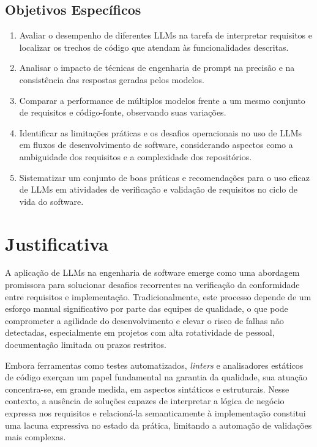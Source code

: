\subsection{Objetivos Específicos}
\begin{enumerate}
    \item Avaliar o desempenho de diferentes LLMs na tarefa de interpretar requisitos e localizar os trechos de código que atendam às funcionalidades descritas.
    
    \item Analisar o impacto de técnicas de engenharia de prompt na precisão e na consistência das respostas geradas pelos modelos.
    
    \item Comparar a performance de múltiplos modelos frente a um mesmo conjunto de requisitos e código-fonte, observando suas variações.
    
    \item Identificar as limitações práticas e os desafios operacionais no uso de LLMs em fluxos de desenvolvimento de software, considerando aspectos como a ambiguidade dos requisitos e a complexidade dos repositórios.
    
    \item Sistematizar um conjunto de boas práticas e recomendações para o uso eficaz de LLMs em atividades de verificação e validação de requisitos no ciclo de vida do software.
\end{enumerate}

\section{Justificativa}

A aplicação de LLMs na engenharia de software emerge como uma abordagem promissora para solucionar desafios recorrentes na verificação da conformidade entre requisitos e implementação. Tradicionalmente, este processo depende de um esforço manual significativo por parte das equipes de qualidade, o que pode comprometer a agilidade do desenvolvimento e elevar o risco de falhas não detectadas, especialmente em projetos com alta rotatividade de pessoal, documentação limitada ou prazos restritos.

Embora ferramentas como testes automatizados, \textit{linters} e analisadores estáticos de código exerçam um papel fundamental na garantia da qualidade, sua atuação concentra-se, em grande medida, em aspectos sintáticos e estruturais. Nesse contexto, a ausência de soluções capazes de interpretar a lógica de negócio expressa nos requisitos e relacioná-la semanticamente à implementação constitui uma lacuna expressiva no estado da prática, limitando a automação de validações mais complexas.

